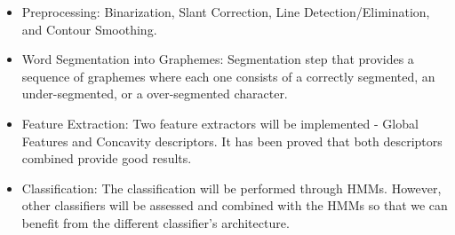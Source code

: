 \documentclass{article}[14pt, oneside, a4paper, times]
\begin{document}
\begin{itemize}
\item Preprocessing: Binarization, Slant Correction, Line Detection/Elimination, and Contour Smoothing. 
\item Word Segmentation into Graphemes: Segmentation step  that provides a sequence of graphemes where each one consists of a correctly segmented, an under-segmented, or a over-segmented character.
\item Feature Extraction: Two feature extractors will be implemented - Global Features and Concavity descriptors. It has been proved that both descriptors combined provide good results.  
\item Classification: The classification will be performed through HMMs. However, other classifiers will be assessed and combined with the HMMs so that we can benefit from the different classifier's architecture. 
\end{itemize}




\end{document}

